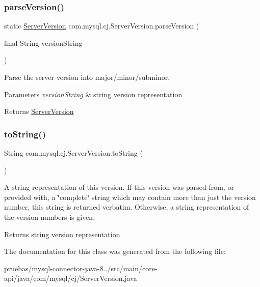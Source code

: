 \subsubsection{\texorpdfstring{parse\+Version()}{parseVersion()}}
{\footnotesize\ttfamily static \mbox{\hyperlink{classcom_1_1mysql_1_1cj_1_1_server_version}{Server\+Version}} com.\+mysql.\+cj.\+Server\+Version.\+parse\+Version (\begin{DoxyParamCaption}\item[{final String}]{version\+String }\end{DoxyParamCaption})\hspace{0.3cm}{\ttfamily [static]}}

Parse the server version into major/minor/subminor.


\begin{DoxyParams}{Parameters}
{\em version\+String} & string version representation \\
\hline
\end{DoxyParams}
\begin{DoxyReturn}{Returns}
\mbox{\hyperlink{classcom_1_1mysql_1_1cj_1_1_server_version}{Server\+Version}} 
\end{DoxyReturn}
\mbox{\label{classcom_1_1mysql_1_1cj_1_1_server_version_ac6732acde7ab4125a366f4c6d2f957f0}} 
\subsubsection{\texorpdfstring{to\+String()}{toString()}}
{\footnotesize\ttfamily String com.\+mysql.\+cj.\+Server\+Version.\+to\+String (\begin{DoxyParamCaption}{ }\end{DoxyParamCaption})}

A string representation of this version. If this version was parsed from, or provided with, a \char`\"{}complete\char`\"{} string which may contain more than just the version number, this string is returned verbatim. Otherwise, a string representation of the version numbers is given.

\begin{DoxyReturn}{Returns}
string version representation 
\end{DoxyReturn}


The documentation for this class was generated from the following file\+:\begin{DoxyCompactItemize}
\item 
pruebas/mysql-\/connector-\/java-\/8../src/main/core-\/api/java/com/mysql/cj/Server\+Version.\+java\end{DoxyCompactItemize}

